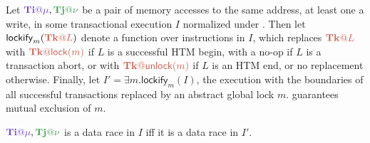 Let $\tiiat{\mu},\tjjat{\nu}$ be a pair of memory accesses to the same address, at least one a write,
in some transactional execution $I$ normalized under .
Then let $\mathsf{lockify}_m(\tkkat{L})$ denote a function over instructions in $I$,
which replaces $\tkkat{L}$ with $\tkkat{\mathsf{lock}(m)}$ if $L$ is a successful HTM begin,
with a no-op if $L$ is a transaction abort,
or with $\tkkat{\mathsf{unlock}(m)}$ if $L$ is an HTM end,
or no replacement otherwise.
Finally, let $I' = \exists m. \mathsf{lockify}_m(I)$,
the execution with the boundaries of all successful transactions replaced by an abstract global lock $m$.
 guarantees mutual exclusion of $m$.
\vspace{1em}

\begin{theorem}
	\label{thm:global-lock}
	$\tiiat{\mu},\tjjat{\nu}$ is a data race in $I$ iff it is a data race in $I'$.
\end{theorem}

